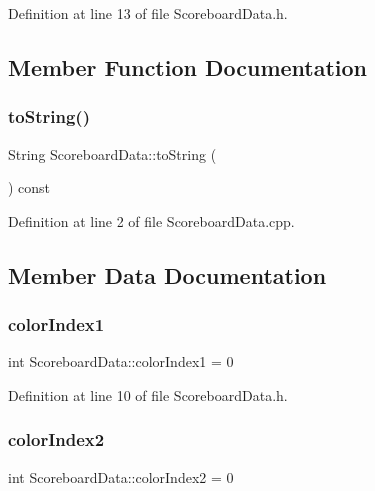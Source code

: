 Definition at line 13 of file Scoreboard\+Data.\+h.



\subsection{Member Function Documentation}
\mbox{\label{struct_scoreboard_data_a1857c6e0cb04be47e30d055458e0fb1b}} 
\subsubsection{\texorpdfstring{to\+String()}{toString()}}
{\footnotesize\ttfamily String Scoreboard\+Data\+::to\+String (\begin{DoxyParamCaption}{ }\end{DoxyParamCaption}) const}



Definition at line 2 of file Scoreboard\+Data.\+cpp.



\subsection{Member Data Documentation}
\mbox{\label{struct_scoreboard_data_a55a771de3adba23e887ea532f7f4524c}} 
\subsubsection{\texorpdfstring{color\+Index1}{colorIndex1}}
{\footnotesize\ttfamily int Scoreboard\+Data\+::color\+Index1 = 0}



Definition at line 10 of file Scoreboard\+Data.\+h.

\mbox{\label{struct_scoreboard_data_accbdaad52d9f539e0f53180c437ab8fa}} 
\subsubsection{\texorpdfstring{color\+Index2}{colorIndex2}}
{\footnotesize\ttfamily int Scoreboard\+Data\+::color\+Index2 = 0}



